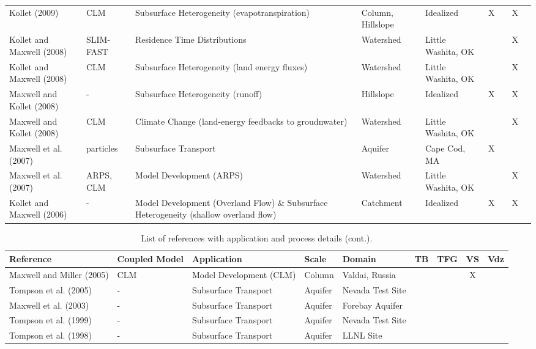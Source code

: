 {\begin{table}
\begin{tabular}{ l  p{1.5cm} p{2cm} p{1.5cm} p{1.5cm} | c | c | c | c }
\cite{K09} Kollet (2009) & CLM & Subsurface Heterogeneity (evapotranspiration) & Column, Hillslope & Idealized & X &   & X &     \\ 
\cite{KM08b} Kollet and Maxwell (2008) & SLIM-FAST & Residence Time Distributions  & Watershed & Little Washita, OK &   &   & X &     \\
\cite{KM08a} Kollet and Maxwell (2008) & CLM & Subsurface Heterogeneity (land energy fluxes) & Watershed & Little Washita, OK &   &   & X &     \\
\cite{MK08b} Maxwell and Kollet (2008) & - & Subsurface Heterogeneity (runoff) & Hillslope & Idealized & X &   & X &     \\
\cite{MK08a} Maxwell and Kollet (2008) & CLM & Climate Change (land-energy feedbacks to groudnwater) & Watershed & Little Washita, OK &   &   & X &     \\
\cite{MWH07} Maxwell et al. (2007) & particles & Subsurface Transport & Aquifer & Cape Cod, MA & X &   &   &     \\
\cite{MCK07} Maxwell et al. (2007) & ARPS, CLM & Model Development (ARPS) & Watershed & Little Washita, OK &   &   & X &     \\
\cite{KM06} Kollet and Maxwell (2006) & - & Model Development (Overland Flow) \& Subsurface Heterogeneity (shallow overland flow) & Catchment & Idealized & X &   & X &     \\

\end{tabular}
\label{pfref2}
\end{table}


\begin{table} \center
\renewcommand{\arraystretch}{2.5}
\center
\caption{List of \parflow{} references with application and process details (cont.).}
\begin{tabular}{ l  p{1.5cm} p{2cm} p{1.5cm} p{1.5cm} | c | c | c | c }
\bf{Reference} & \bf{Coupled Model} & \bf{Application} & \bf{Scale} & \bf{Domain} & \bf{TB} & \bf{TFG} & \bf{VS} & \bf{Vdz} \\ 
\hline{}

\cite{MM05} Maxwell and Miller (2005) & CLM & Model Development (CLM) & Column & Valdai, Russia &   &   & X &     \\
\cite{TMCZPS05} Tompson et al. (2005) & - & Subsurface Transport & Aquifer & Nevada Test Site &   &   &   &     \\
\cite{MWT03} Maxwell et al. (2003) & - & Subsurface Transport & Aquifer & Forebay Aquifer &   &   &   &     \\
\cite{TBP99} Tompson et al. (1999) & - & Subsurface Transport & Aquifer & Nevada Test Site &   &   &   &     \\
\cite{TFSBA98} Tompson et al. (1998) & - & Subsurface Transport & Aquifer & LLNL Site &   &   &   &     \\

\end{tabular}
\label{pfref1}
\end{table}

}
